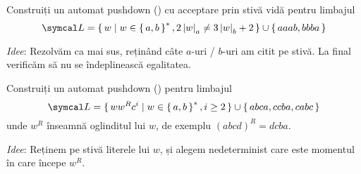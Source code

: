 \begin{exercise}
    Construiți un automat pushdown (\pda{}) cu acceptare prin stivă vidă pentru limbajul
    \[
        \limbaj = \set{ w | w \in \set{a, b}^*, 2 \abs{w}_a \neq 3 \abs{w}_b + 2 } \cup \set{ aaab, bbba }
    \]
\end{exercise}

\textit{Idee}: Rezolvăm ca mai sus, reținând câte \(a\)-uri / \(b\)-uri am citit pe stivă. La final verificăm să nu se îndeplinească egalitatea.

\begin{exercise}
    Construiți un automat pushdown (\pda{}) pentru limbajul
    \[
        \limbaj = \set{ w w^R c^i | w \in \set{a, b}^*, i \geq 2 } \cup \set{ abca, ccba, cabc }
    \]
    unde \(w^R\) înseamnă oglinditul lui \(w\), de exemplu \((abcd)^R = dcba\).
\end{exercise}

\textit{Idee}: Reținem pe stivă literele lui \(w\), și alegem nedeterminist care este momentul în care începe \(w^R\).

